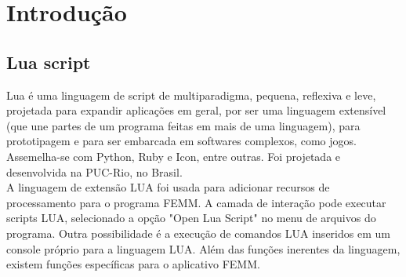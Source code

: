 \section{Introdução}
\label{cap2:introducao}

\subsection{Lua script}
Lua é uma linguagem de script de multiparadigma, pequena, reflexiva e leve, projetada para expandir aplicações em geral, por ser uma linguagem extensível (que une partes de um programa feitas em mais de uma linguagem), para prototipagem e para ser embarcada em softwares complexos, como jogos. Assemelha-se com Python, Ruby e Icon, entre outras. Foi projetada e desenvolvida na PUC-Rio, no Brasil.\\
A linguagem de extensão LUA foi usada para adicionar recursos de processamento para o programa FEMM. A camada de interação pode executar scripts LUA, selecionado a opção "Open Lua Script" no menu de arquivos do programa. Outra possibilidade é a execução de comandos LUA inseridos em um console próprio para a linguagem LUA. Além das funções inerentes da linguagem, existem funções específicas para o aplicativo FEMM.
